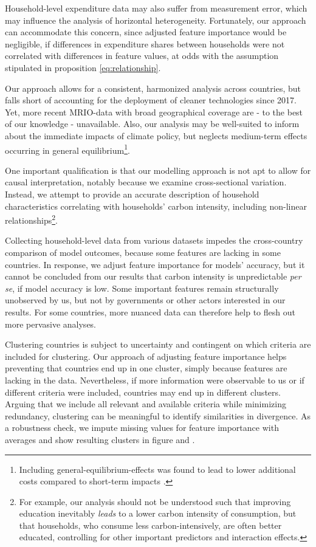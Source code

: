 \documentclass[12pt, a4paper]{article}
\begin{document}
Household-level expenditure data may also suffer from measurement error, which may influence the analysis of horizontal heterogeneity. Fortunately, our approach can accommodate this concern, since adjusted feature importance would be negligible, if differences in expenditure shares between households were not correlated with differences in feature values, at odds with the assumption stipulated in proposition \ref{eq:relationship}.

Our approach allows for a consistent, harmonized analysis across countries, but falls short of accounting for the deployment of cleaner technologies since 2017. Yet, more recent MRIO-data with broad geographical coverage are - to the best of our knowledge - unavailable. Also, our analysis may be well-suited to inform about the immediate impacts of climate policy, but neglects medium-term effects occurring in general equilibrium\footnote{Including general-equilibrium-effects was found to lead to lower additional costs compared to short-term impacts \autocite{Ohlendorf.2021}.}. 

One important qualification is that our modelling approach is not apt to allow for causal interpretation, notably because we examine cross-sectional variation. Instead, we attempt to provide an accurate description of household characteristics correlating with households' carbon intensity, including non-linear relationships\footnote{For example, our analysis should not be understood such that improving education inevitably \textit{leads} to a lower carbon intensity of consumption, but that households, who consume less carbon-intensively, are often better educated, controlling for other important predictors and interaction effects.}.

Collecting household-level data from various datasets impedes the cross-country comparison of model outcomes, because some features are lacking in some countries. In response, we adjust feature importance for models' accuracy, but it cannot be concluded from our results that carbon intensity is unpredictable \textit{per se}, if model accuracy is low. Some important features remain structurally unobserved by us, but not by governments or other actors interested in our results. For some countries, more nuanced data can therefore help to flesh out more pervasive analyses.

Clustering countries is subject to uncertainty and contingent on which criteria are included for clustering. Our approach of adjusting feature importance helps preventing that countries end up in one cluster, simply because features are lacking in the data. Nevertheless, if more information were observable to us or if different criteria were included, countries may end up in different clusters. Arguing that we include all relevant and available criteria while minimizing redundancy, clustering can be meaningful to identify similarities in divergence. As a robustness check, we impute missing values for feature importance with averages and show resulting clusters in figure  and .
\end{document}
